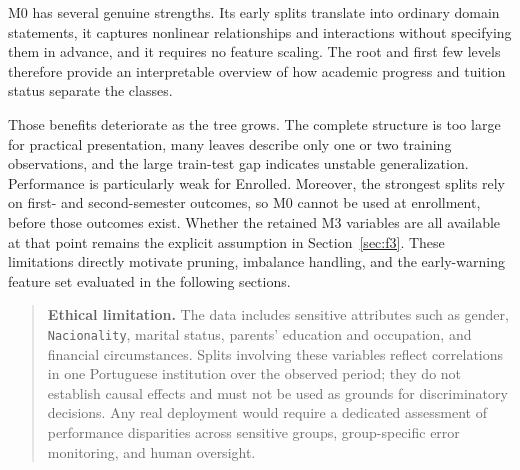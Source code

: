 M0 has several genuine strengths. Its early splits translate into ordinary
domain statements, it captures nonlinear relationships and interactions
without specifying them in advance, and it requires no feature scaling. The
root and first few levels therefore provide an interpretable overview of how
academic progress and tuition status separate the classes.

Those benefits deteriorate as the tree grows. The complete structure is too
large for practical presentation, many leaves describe only one or two
training observations, and the large train-test gap indicates unstable
generalization. Performance is particularly weak for Enrolled. Moreover, the
strongest splits rely on first- and second-semester outcomes, so M0 cannot be
used at enrollment, before those outcomes exist. Whether the retained M3
variables are all available at that point remains the explicit assumption in
Section~\ref{sec:f3}. These
limitations directly motivate pruning, imbalance handling, and the
early-warning feature set evaluated in the following sections.

\begin{quote}
\small
\textbf{Ethical limitation.} The data includes sensitive attributes such as
gender, \texttt{Nacionality}, marital status, parents' education and occupation,
and financial circumstances. Splits involving these variables reflect
correlations in one Portuguese institution over the observed period; they do
not establish causal effects and must not be used as grounds for discriminatory
decisions. Any real deployment would require a dedicated assessment of
performance disparities across sensitive groups, group-specific error
monitoring, and human oversight.
\end{quote}
